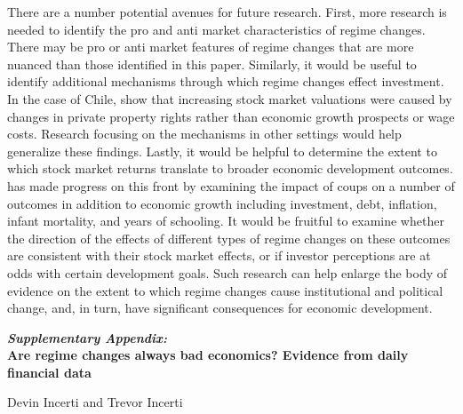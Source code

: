\documentclass[12pt,final,fleqn]{article}
\theoremstyle{plain}
\begin{document}
There are a number potential avenues for future research. First, more research is needed to identify the pro and anti market characteristics of regime changes. There may be pro or anti market features of regime changes that are more nuanced than those identified in this paper. Similarly, it would be useful to identify additional mechanisms through which regime changes effect investment. In the case of Chile,  \citet{girardi2018institution} show that increasing stock market valuations were caused by changes in private property rights rather than economic growth prospects or wage costs. Research focusing on the mechanisms in other settings would help generalize these findings. Lastly, it would be helpful to determine the extent to which stock market returns translate to broader economic development outcomes. \citet{meyersson2016political} has made progress on this front by examining the impact of coups on a number of outcomes in addition to economic growth including investment, debt, inflation, infant mortality, and years of schooling. It would be fruitful to examine whether the direction of the effects of different types of regime changes on these outcomes are consistent with their stock market effects, or if investor perceptions are at odds with certain development goals. Such research can help enlarge the body of evidence on the extent to which regime changes cause institutional and political change, and, in turn, have significant consequences for economic development.

\newpage





\newpage
\appendix
\setcounter{secnumdepth}{1}
\setcounter{table}{0}
\setcounter{figure}{0}
\renewcommand\thetable{\Alph{section}.\arabic{table}}
\renewcommand\thefigure{\Alph{section}.\arabic{figure}}

\newpage

\begin{centering}
\LARGE
\textbf{\textit{Supplementary Appendix:}} \\
 \vspace{0.5cm}
\textbf{Are regime changes always bad economics? Evidence from daily financial data} \\

\vspace{0.5cm}

\large
Devin Incerti and Trevor Incerti
 
\end{centering}
\end{document}
